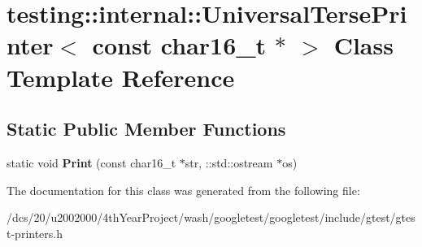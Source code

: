 \hypertarget{classtesting_1_1internal_1_1UniversalTersePrinter_3_01const_01char16__t_01_5_01_4}{}\section{testing\+:\+:internal\+:\+:Universal\+Terse\+Printer$<$ const char16\+\_\+t $\ast$ $>$ Class Template Reference}
\label{classtesting_1_1internal_1_1UniversalTersePrinter_3_01const_01char16__t_01_5_01_4}
\subsection*{Static Public Member Functions}
\begin{DoxyCompactItemize}
\item 
\mbox{\label{classtesting_1_1internal_1_1UniversalTersePrinter_3_01const_01char16__t_01_5_01_4_a0d839218e44fd426359fcf049e1fdded}} 
static void {\bfseries Print} (const char16\+\_\+t $\ast$str, \+::std\+::ostream $\ast$os)
\end{DoxyCompactItemize}


The documentation for this class was generated from the following file\+:\begin{DoxyCompactItemize}
\item 
/dcs/20/u2002000/4th\+Year\+Project/wash/googletest/googletest/include/gtest/gtest-\/printers.\+h\end{DoxyCompactItemize}
